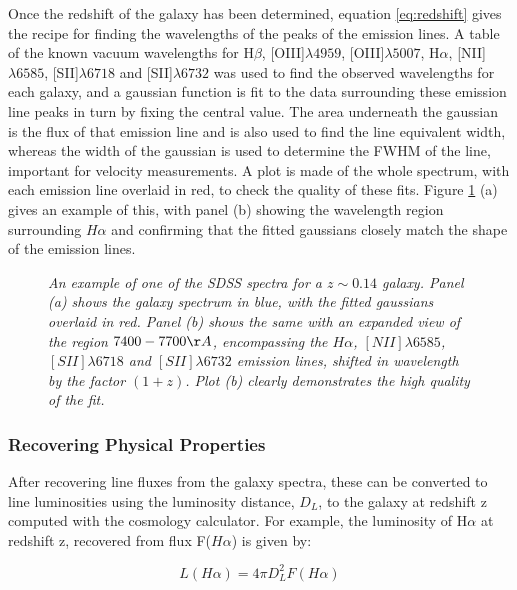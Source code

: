 \documentclass{literature}
\begin{document}
Once the redshift of the galaxy has been determined, equation \ref{eq:redshift} gives the recipe for finding the wavelengths of the peaks of the emission lines. A table of the known vacuum wavelengths for H$\beta$, [OIII]$\lambda 4959$, [OIII]$\lambda 5007$, H$\alpha$, [NII]$\lambda 6585$, [SII]$\lambda 6718$ and [SII]$\lambda 6732$ was used to find the observed wavelengths for each galaxy, and a gaussian function is fit to the data surrounding these emission line peaks in turn by fixing the central value. The area underneath the gaussian is the flux of that emission line and is also used to find the line equivalent width, whereas the width of the gaussian is used to determine the FWHM of the line, important for velocity measurements. A plot is made of the whole spectrum, with each emission line overlaid in red, to check the quality of these fits. Figure \ref{fig:fitted_spec} (a) gives an example of this, with panel (b) showing the wavelength region surrounding $H\alpha$ and confirming that the fitted gaussians closely match the shape of the emission lines.\\    

\begin{figure}[!htp]
\centering
{}
\caption{\footnotesize{\emph{An example of one of the SDSS spectra for a $z\sim 0.14$ galaxy. Panel (a) shows the galaxy spectrum in blue, with the fitted gaussians overlaid in red. Panel (b) shows the same with an expanded view of the region $7400-7700\AA$, encompassing the $H\alpha$, $[NII]\lambda 6585$, $[SII]\lambda 6718$ and $[SII]\lambda 6732$ emission lines, shifted in wavelength by the factor $(1 + z)$. Plot (b) clearly demonstrates the high quality of the fit.}}}
\label{fig:fitted_spec}
\end{figure}



\subsubsection{Recovering Physical Properties}
After recovering line fluxes from the galaxy spectra, these can be converted to line luminosities using the luminosity distance, $D_{L}$, to the galaxy at redshift z computed with the cosmology calculator. For example, the luminosity of H$\alpha$ at redshift z, recovered from flux F($H\alpha$) is given by: 

\begin{equation}
\label{eq:flux-lum}
 	L(H\alpha) = 4\pi D_{L}^{2} F(H\alpha)
\end{equation} 
\end{document}
